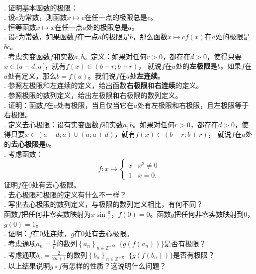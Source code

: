 \documentclass[12pt,UTF8]{ctexbook}
\begin{document}
\begin{xt}
    \mbox{} \\
    . 证明基本函数的极限：\\
    . 设$c$为常数，则函数$x\mapsto c$在任一点的极限总是$c$。\\
    . 恒等函数$x\mapsto x$在任一点$a$处的极限总是$a$。\\
    . 设$c$为常数，如果函数$f$在一点$a$的极限是$b$，那么函数$x\mapsto cf(x)$在$a$处的极限是$bc$。\\
    . 考虑实变函数$f$和实数$a, b$。定义：如果对任何$r>0$，都存在$d>0$，使得只要$x\in(a-d;a\,]$，就有$f(x)\in(b-r;b+r)$，
    就说$f$在$a$处的\textbf{左极限}是$b$。如果$f$在$a$处有定义，那么$b=f(a)$。我们说$f$在$a$处\textbf{左连续}。\\
    . 参照左极限和左连续的定义，给出函数\textbf{右极限}和\textbf{右连续}的定义。\\
    . 参照极限的数列定义，给出左极限和右极限的数列定义。\\
    . 证明：函数$f$在$a$处有极限，当且仅当它在$a$处有左极限和右极限，且左极限等于右极限。\\
    . 定义去心极限：设有实变函数$f$和实数$a, b$。如果对任何$r>0$，都存在$d>0$，使得只要$x\in(a-d;a)\cup(a;a+d)$，就有$f(x)\in(b-r;b+r)$，
    就说$f$在$a$处的\textbf{去心极限}是$b$。\\
    . 考虑函数：
    $$f:x\mapsto \begin{cases}
    x & x^2 \neq 0 \\
    1 & x = 0.
    \end{cases}
    $$
    \indent \qquad 证明$f$在$0$处有去心极限。\\
    . 去心极限和极限的定义有什么不一样？\\
    . 写出去心极限的数列定义，与极限的数列定义相比，有何不同？\\
    \indent \qquad 函数$f$把任何非零实数映射为$\displaystyle x\sin{\frac{\pi}{x}}$，$f(0) = 0$。函数$g$把任何非零实数映射到$0$，$g(0) = 1$。\\
    . 证明：$f$在$0$处连续，$g$在$0$处有去心极限。\\
    . 考虑通项$a_n = \frac{1}{n}$的数列$\left\{a_n\right\}_{n\in\mathbb{Z}^+}$。$\{g(f(a_n))\}$是否有极限？\\
    . 考虑通项$b_n = \frac{2}{2n+1}$的数列$\left\{b_n\right\}_{n\in\mathbb{Z}^+}$。$\{g(f(b_n))\}$是否有极限？\\
    . 以上结果说明$g\circ f$有怎样的性质？这说明什么问题？
\end{xt}
\end{document}
